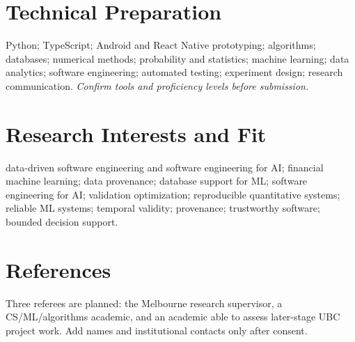 \documentclass[11pt]{article}
\begin{document}
\section*{Technical Preparation}
Python; TypeScript; Android and React Native prototyping; algorithms; databases; numerical methods; probability and statistics; machine learning; data analytics; software engineering; automated testing; experiment design; research communication. \textit{Confirm tools and proficiency levels before submission.}

\section*{Research Interests and Fit}
data-driven software engineering and software engineering for AI; financial machine learning; data provenance; database support for ML; software engineering for AI; validation optimization; reproducible quantitative systems; reliable ML systems; temporal validity; provenance; trustworthy software; bounded decision support.

\section*{References}
Three referees are planned: the Melbourne research supervisor, a CS/ML/algorithms academic, and an academic able to assess later-stage UBC project work. Add names and institutional contacts only after consent.
\end{document}
